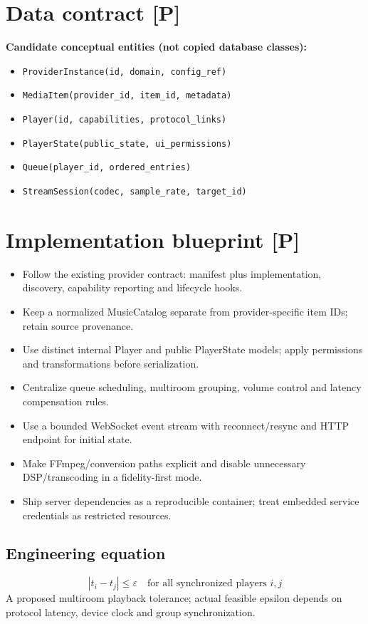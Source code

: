 \documentclass[10pt,a4paper,oneside]{report}
\begin{document}
\section{Data contract [P]}
\begin{evidencebox}\small\textbf{Candidate conceptual entities (not copied database classes):}\par
\begin{itemize}[leftmargin=*,itemsep=1pt,topsep=2pt]
\item \texttt{ProviderInstance(id, domain, config\_ref)}
\item \texttt{MediaItem(provider\_id, item\_id, metadata)}
\item \texttt{Player(id, capabilities, protocol\_links)}
\item \texttt{PlayerState(public\_state, ui\_permissions)}
\item \texttt{Queue(player\_id, ordered\_entries)}
\item \texttt{StreamSession(codec, sample\_rate, target\_id)}
\end{itemize}\end{evidencebox}
\section{Implementation blueprint [P]}
\begin{itemize}[leftmargin=*,itemsep=2pt,topsep=3pt]
\item Follow the existing provider contract: manifest plus implementation, discovery, capability reporting and lifecycle hooks.
\item Keep a normalized MusicCatalog separate from provider-specific item IDs; retain source provenance.
\item Use distinct internal Player and public PlayerState models; apply permissions and transformations before serialization.
\item Centralize queue scheduling, multiroom grouping, volume control and latency compensation rules.
\item Use a bounded WebSocket event stream with reconnect/resync and HTTP endpoint for initial state.
\item Make FFmpeg/conversion paths explicit and disable unnecessary DSP/transcoding in a fidelity-first mode.
\item Ship server dependencies as a reproducible container; treat embedded service credentials as restricted resources.
\end{itemize}
\subsection*{Engineering equation}
\begin{equation*}|t_i-t_j|\le\varepsilon\quad\text{for all synchronized players }i,j\end{equation*}
A proposed multiroom playback tolerance; actual feasible epsilon depends on protocol latency, device clock and group synchronization.\par
\end{document}
